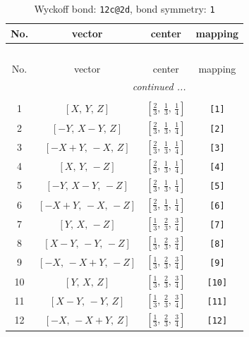 \documentclass[fleqn,8pt]{jsarticle}
\begin{document}
\renewcommand{\arraystretch}{1.2}
\begin{longtable}{cccc}
\caption{Wyckoff bond: {\tt 12c@2d}, bond symmetry: {\tt 1}}
 \\
 \hline \hline
No. & vector & center & mapping \\ \hline \endfirsthead

\multicolumn{3}{l}{\tablename\ \thetable{}} \\
 \hline \hline
No. & vector & center & mapping \\ \hline \endhead

 \hline \hline
\multicolumn{3}{r}{\footnotesize\it continued ...} \\ \endfoot

 \hline \hline
\multicolumn{3}{r}{} \\ \endlastfoot

1 & $\left[ X,\, Y,\, Z \right]$ & $\left[ \frac{2}{3},\, \frac{1}{3},\, \frac{1}{4} \right]$ & {\tt [1]} \\ \hline
2 & $\left[ - Y,\, X - Y,\, Z \right]$ & $\left[ \frac{2}{3},\, \frac{1}{3},\, \frac{1}{4} \right]$ & {\tt [2]} \\ \hline
3 & $\left[ - X + Y,\, - X,\, Z \right]$ & $\left[ \frac{2}{3},\, \frac{1}{3},\, \frac{1}{4} \right]$ & {\tt [3]} \\ \hline
4 & $\left[ X,\, Y,\, - Z \right]$ & $\left[ \frac{2}{3},\, \frac{1}{3},\, \frac{1}{4} \right]$ & {\tt [4]} \\ \hline
5 & $\left[ - Y,\, X - Y,\, - Z \right]$ & $\left[ \frac{2}{3},\, \frac{1}{3},\, \frac{1}{4} \right]$ & {\tt [5]} \\ \hline
6 & $\left[ - X + Y,\, - X,\, - Z \right]$ & $\left[ \frac{2}{3},\, \frac{1}{3},\, \frac{1}{4} \right]$ & {\tt [6]} \\ \hline
7 & $\left[ Y,\, X,\, - Z \right]$ & $\left[ \frac{1}{3},\, \frac{2}{3},\, \frac{3}{4} \right]$ & {\tt [7]} \\ \hline
8 & $\left[ X - Y,\, - Y,\, - Z \right]$ & $\left[ \frac{1}{3},\, \frac{2}{3},\, \frac{3}{4} \right]$ & {\tt [8]} \\ \hline
9 & $\left[ - X,\, - X + Y,\, - Z \right]$ & $\left[ \frac{1}{3},\, \frac{2}{3},\, \frac{3}{4} \right]$ & {\tt [9]} \\ \hline
10 & $\left[ Y,\, X,\, Z \right]$ & $\left[ \frac{1}{3},\, \frac{2}{3},\, \frac{3}{4} \right]$ & {\tt [10]} \\ \hline
11 & $\left[ X - Y,\, - Y,\, Z \right]$ & $\left[ \frac{1}{3},\, \frac{2}{3},\, \frac{3}{4} \right]$ & {\tt [11]} \\ \hline
12 & $\left[ - X,\, - X + Y,\, Z \right]$ & $\left[ \frac{1}{3},\, \frac{2}{3},\, \frac{3}{4} \right]$ & {\tt [12]} \\
\end{longtable}
\end{document}
